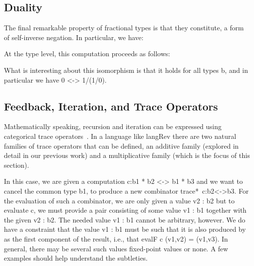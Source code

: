 \documentclass{llncs}
\begin{document}

\subsection{Duality}

The final remarkable property of fractional types is that they
constitute, a form of self-inverse negation. In particular, we have:


\noindent At the type level, this computation proceeds as follows:


What is interesting about this isomorphism is that it holds for all
types {{b}}, and in particular we have {{0 <-> 1/(1/0)}}.

\subsection{Feedback, Iteration, and Trace Operators}

Mathematically speaking, recursion and iteration can be expressed using
categorical trace
operators~\cite{joyal1996traced,Hasegawa:1997:RCS:645893.671607}.  In a
language like {{langRev}} there are two natural families of trace operators
that can be defined, an additive family (explored in detail in our previous
work) and a multiplicative family (which is the focus of this section). 

In this case, we are given a computation {{c:b1 * b2 <-> b1 * b3}} and we
want to cancel the common type {{b1}}, to produce a new combinator
{{trace*~c:b2<->b3}}. For the evaluation of such a combinator, we are only
given a value {{v2 : b2}} but to evaluate {{c}}, we must provide a pair
consisting of some value {{v1 : b1}} together with the given {{v2 : b2}}. The
needed value {{v1 : b1}} cannot be arbitrary, however. We do have a
constraint that the value {{v1 : b1}} must be such that it is also produced
by as the first component of the result, i.e., 
that {{evalF c (v1,v2) = (v1,v3)}}. In general, there may be several 
such values fixed-point values or none. 
A few examples should help understand the subtleties.
\end{document}
